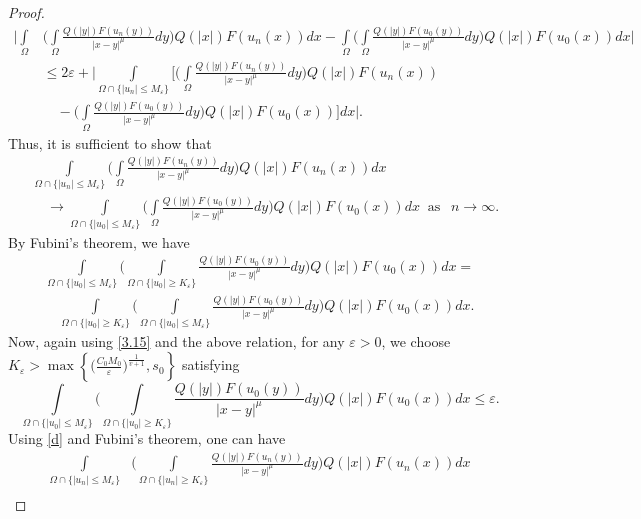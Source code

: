 \documentclass[11pt]{amsart}
\numberwithin{equation}{section}
\newcommand{\1}{\frac{1}{2}}
\begin{document}
\begin{proof}
\begin{align}
			\Bigg| \int\limits_{\Omega} &\Bigg( \int\limits_{\Omega} \frac{Q(|y|)F(u_n(y))}{|x-y|^\mu}dy \Bigg) Q(|x|)F(u_n(x))dx -\int\limits_{\Omega} \Bigg( \int\limits_{\Omega} \frac{Q(|y|)F(u_0(y))}{|x-y|^\mu}dy \Bigg) Q(|x|)F(u_0(x))dx\Bigg| \nonumber\\
			& \leq 2\varepsilon +\Bigg| \int\limits_{\Omega \cap \{ |u_n| \leq M_\varepsilon\}} \bigg[\Bigg( \int\limits_{\Omega} \frac{Q(|y|)F(u_n(y))}{|x-y|^\mu}dy \Bigg) Q(|x|)F(u_n(x))\nonumber\\
			&  \quad- \Bigg( \int\limits_{\Omega} \frac{Q(|y|)F(u_0(y))}{|x-y|^\mu}dy \Bigg) Q(|x|)F(u_0(x))\bigg]dx \Bigg|. \nonumber
		\end{align}
		Thus, it is sufficient to show that
		\begin{align}&\displaystyle\int\limits_{\Omega \cap \{ |u_n| \leq M_\varepsilon\}} \Bigg( \int\limits_{\Omega} \frac{Q(|y|)F(u_n(y))}{|x-y|^\mu}dy \Bigg) Q(|x|)F(u_n(x))dx  \nonumber\\
			&\quad \to \int\limits_{\Omega \cap \{|u_0| \leq M_\varepsilon\}} \Bigg( \int\limits_{\Omega} \frac{Q(|y|)F(u_0(y))}{|x-y|^\mu}dy \Bigg) Q(|x|)F(u_0(x))dx \ \text{ as } \  \ n\to \infty. \nonumber
		\end{align}
		By Fubini's theorem, we have 
		\begin{align*}
			\int\limits_{\Omega \cap \{|u_0| \leq M_\varepsilon\}} \Bigg( \int\limits_{\Omega \cap \{|u_0|\geq K_\varepsilon\}} \frac{Q(|y|)F(u_0(y))}{|x-y|^\mu}dy \Bigg) Q(|x|)F(u_0(x))dx =\\
			\quad \int\limits_{\Omega \cap \{|u_0|\geq K_\varepsilon\}} \Bigg( \int\limits_{\Omega \cap \{|u_0| \leq M_\varepsilon\}} \frac{Q(|y|)F(u_0(y))}{|x-y|^\mu}dy \Bigg) Q(|x|)F(u_0(x))dx.
		\end{align*}
		Now, again using \eqref{3.15} and the above relation, for any $\varepsilon>0$, we choose $K_\varepsilon > \max\left\{ \Big(\frac{C_0 M_0}{\varepsilon}\Big)^{\frac{1}{v+1}}, s_0\right\}$ satisfying
		\begin{equation}
			\label{3.18}
			\int\limits_{\Omega \cap \{|u_0| \leq M_\varepsilon\}} \Bigg( \int\limits_{\Omega \cap \{|u_0|\geq K_\varepsilon\}} \frac{Q(|y|)F(u_0(y))}{|x-y|^\mu}dy \Bigg) Q(|x|)F(u_0(x))dx \leq \varepsilon.
		\end{equation} 
		Using \eqref{d} and Fubini's theorem, one can have
		\begin{align}
			\int\limits_{\Omega \cap \{|u_n| \leq M_\varepsilon\}}& \Bigg( \int\limits_{\Omega \cap \{|u_n|\geq K_\varepsilon\}} \frac{Q(|y|)F(u_n(y))}{|x-y|^\mu}dy \Bigg) Q(|x|)F(u_n(x))dx \nonumber\\

\end{align}
\end{proof}
\end{document}
